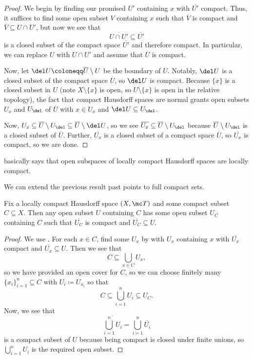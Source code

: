 \documentclass[../notes.tex]{subfiles}
\begin{document}
\begin{proof}
	We begin by finding our promised $U'$ containing $x$ with $\overline{U'}$ compact. Thus, it suffices to find some open subset $V$ containing $x$ such that $\overline V$ is compact and $\overline V\subseteq U\cap U'$, but now we see that
	\[\overline{U\cap U'}\subseteq\overline{U'}\]
	is a closed subset of the compact space $\overline{U'}$ and therefore compact. In particular, we can replace $U$ with $U\cap U'$ and assume that $\overline U$ is compact.

	Now, let $\del U\coloneqq\overline U\setminus U$ be the boundary of $U$. Notably, $\del U$ is a closed subset of the compact space $\overline U$, so $\del U$ is compact. Because $\{x\}$ is a closed subset in $U$ (note $X\setminus\{x\}$ is open, so $U\setminus\{x\}$ is open in the relative topology), the fact that compact Hausdorff spaces are normal grants open subsets $U_x$ and $U_{\del}$ of $\overline U$ with $x\in U_x$ and $\del U\subseteq U_\del$.

	Now, $U_x\subseteq\overline U\setminus U_\del\subseteq\overline U\setminus{\del U}$, so we see $\overline{U_x}\subseteq\overline U\setminus U_\del$ because $\overline U\setminus U_\del$ is a closed subset of $\overline U$. Further, $\overline{U_x}$ is a closed subset of a compact space $\overline U$, so $\overline{U_x}$ is compact, so we are done.
\end{proof}
\begin{remark}
	 basically says that open subspaces of locally compact Hausdorff spaces are locally compact.
\end{remark}
We can extend the previous result past points to full compact sets.
\begin{lemma} \label{lem:best-loc-compact}
	Fix a locally compact Hausdorff space $(X,\mc T)$ and some compact subset $C\subseteq X$. Then any open subset $U$ containing $C$ has some open subset $U_C$ containing $C$ such that $\overline{U_C}$ is compact and $\overline{U_C}\subseteq U$.
\end{lemma}
\begin{proof}
	We use . For each $x\in C$, find some $U_x$ by  with $U_x$ containing $x$ with $\overline{U_x}$ compact and $\overline{U_x}\subseteq U$. Then we see that
	\[C\subseteq\bigcup_{x\in C}U_x,\]
	so we have provided an open cover for $C$, so we can choose finitely many $\{x_i\}_{i=1}^n\subseteq C$ with $U_i\coloneqq U_{x_i}$ so that
	\[C\subseteq\bigcup_{i=1}^nU_i\subseteq U_C.\]
	Now, we see that
	\[\overline{\bigcup_{i=1}^nU_i}=\bigcup_{i=1}^n\overline{U_i}\]
	is a compact subset of $U$ because being compact is closed under finite unions, so $\bigcup_{i=1}^nU_i$ is the required open subset.
\end{proof}
\end{document}
